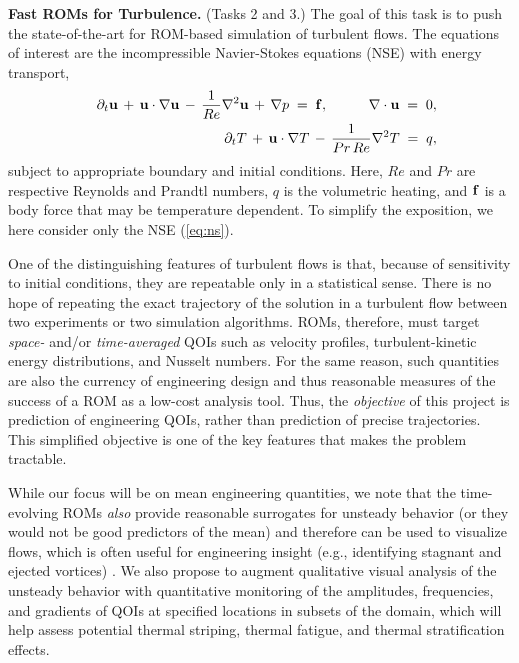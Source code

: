 \vspace{.08in}
\noindent \textbf{Fast ROMs for Turbulence.} (Tasks 2 and 3.)
The goal of this task is to push the state-of-the-art for ROM-based 
simulation of turbulent flows.
The equations of interest are the incompressible Navier-Stokes equations
(NSE) with energy transport, \\[-2.6ex]
\begin{eqnarray} \label{eq:ns}
&&
\partial_t \mathbf{u} \,+\, \mathbf{u} \cdot \nabla \mathbf{u} \,-\, \frac{1}{Re} \nabla^2 \mathbf{u}
\,+\, \nabla p \;=\; \mathbf{f}, \hspace*{.4in} \nabla \cdot \mathbf{u} \;=\; 0, 
\\ \label{eq:therm} 
&&
\partial_t T   \,+\, \mathbf{u} \cdot \nabla T   \,-\, \frac{1}{Pr\,Re} \nabla^2 T
\;=\; q, 
\end{eqnarray}
subject to appropriate boundary and initial conditions. Here, $Re$ and $Pr$ are
respective Reynolds and Prandtl numbers, $q$ is the volumetric heating, and
$\mathbf{f}$ is a body force that may be temperature dependent.
   To simplify the exposition, we here consider only the NSE (\ref{eq:ns}).

One of the distinguishing features of turbulent flows is that, because of
sensitivity to initial conditions, they are repeatable only in a statistical
sense.  There is no hope of repeating the exact trajectory of the solution in a
turbulent flow between two experiments or two simulation algorithms.  ROMs,
therefore, must target {\em space-} and/or {\em time-averaged} QOIs such as
velocity profiles,  turbulent-kinetic energy distributions, and Nusselt
numbers.  For the same reason, such quantities are also the currency of
engineering design and thus reasonable measures of the success of a ROM as a
low-cost analysis tool.  Thus, the {\em objective} of this project is
prediction of engineering QOIs, rather than prediction of precise 
trajectories.  This simplified objective is one of the key features that makes
the problem tractable.

    While our focus will be on mean engineering quantities, we note that the
time-evolving ROMs {\em also} provide reasonable surrogates for unsteady
behavior (or they would not be good predictors of the mean) and therefore can
be used to visualize flows, which is often useful for engineering insight
(e.g., identifying stagnant and ejected vortices)
.  We also propose to augment
qualitative visual analysis of the unsteady behavior with quantitative
monitoring of the amplitudes, frequencies, and gradients of QOIs at specified
locations in subsets of the domain, which will help assess potential
thermal striping, thermal fatigue, and thermal stratification effects.

